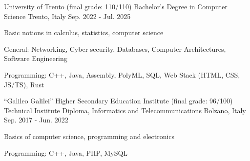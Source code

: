 

\begin{cventries}

  \cventry
    {University of Trento (final grade: 110/110)}
    {Bachelor's Degree in Computer Science}
    {Trento, Italy}
    {Sep. 2022 - Jul. 2025} %
    {
      \begin{cvitems} %
        \item {Basic notions in calculus, statistics, computer science}
        \item {General: Networking, Cyber security, Databases, Computer Architectures, Software Engineering}
        \item {Programming: C++, Java, Assembly, PolyML, SQL, Web Stack (HTML, CSS, JS/TS), Rust}
      \end{cvitems}
    }

  \cventry
    {“Galileo Galilei” Higher Secondary Education Institute (final grade: 96/100)} %
    {Technical Institute Diploma, Informatics and Telecommunications} %
    {Bolzano, Italy} %
    {Sep. 2017 - Jun. 2022} %
    {
      \begin{cvitems} %
        \item {Basics of computer science, programming and electronics}
        \item {Programming: C++, Java, PHP, MySQL}
      \end{cvitems}
    }

\end{cventries}
